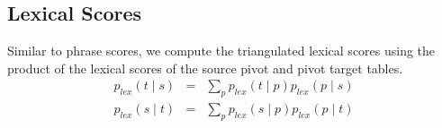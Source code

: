 \documentclass[11pt]{article}
\begin{document}
\subsection{Lexical Scores}
\label{sec:lexical_scores}
	Similar to phrase scores, we compute the triangulated lexical scores using the product of the lexical scores of the source pivot and pivot target tables.   
	\begin{eqnarray}
        p_{lex}(t \mid s) &=& \sum_{p} p_{lex}(t \mid p) p_{lex}(p \mid s) \\
        p_{lex}(s \mid t) &=& \sum_{p} p_{lex}(s \mid p) p_{lex}(p \mid t)
	\end{eqnarray}
\end{document}
